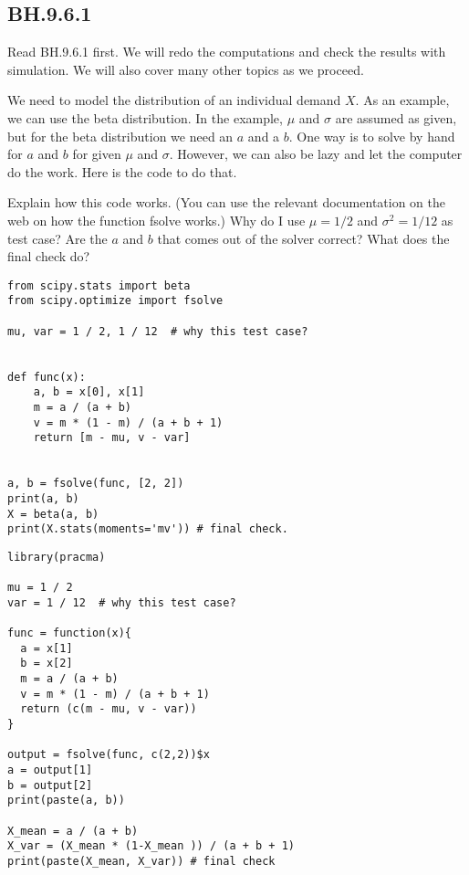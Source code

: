 
\subsection{BH.9.6.1}
\label{sec:bh.9.6.1}

Read BH.9.6.1 first. We will redo the computations and check the results with simulation. We will also cover many other topics as we proceed.



\begin{exercise}
We need to model the distribution of an individual demand $X$.
As an example, we can use the beta distribution. In the example, $\mu$ and $\sigma$ are assumed as given, but for the beta distribution we need an $a$ and a $b$. One way is to solve by hand for $a$ and $b$ for given $\mu$ and $\sigma$. However, we can also be lazy and let the computer do the work. Here is the code to do that.

Explain how this code works. (You can use the relevant documentation on the web on how the function fsolve works.) Why do I use $\mu=1/2$ and $\sigma^{2}=1/12$ as test case? Are the $a$ and $b$ that comes out of the solver correct? What does the final check do?
\begin{verbatim}
from scipy.stats import beta
from scipy.optimize import fsolve

mu, var = 1 / 2, 1 / 12  # why this test case?


def func(x):
    a, b = x[0], x[1]
    m = a / (a + b)
    v = m * (1 - m) / (a + b + 1)
    return [m - mu, v - var]


a, b = fsolve(func, [2, 2])
print(a, b)
X = beta(a, b)
print(X.stats(moments='mv')) # final check.
\end{verbatim}

\begin{verbatim}
library(pracma)

mu = 1 / 2 
var = 1 / 12  # why this test case?

func = function(x){
  a = x[1]
  b = x[2]
  m = a / (a + b)
  v = m * (1 - m) / (a + b + 1)
  return (c(m - mu, v - var))
}

output = fsolve(func, c(2,2))$x
a = output[1]
b = output[2]
print(paste(a, b))

X_mean = a / (a + b)
X_var = (X_mean * (1-X_mean )) / (a + b + 1)
print(paste(X_mean, X_var)) # final check

\end{verbatim}

\end{exercise}

